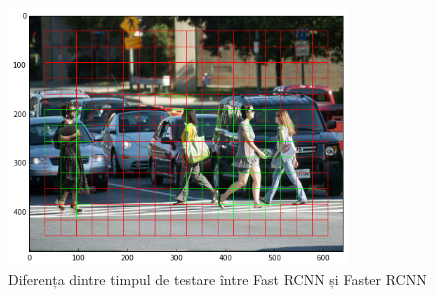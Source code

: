\begin{figure}[h!]
    	\centering
	\captionsetup{justification=centering, margin=2cm}
	\includegraphics[width=0.8\textwidth]{figures/last_con_lay_to_inp_img.png}
	\caption{Diferența dintre timpul de testare între  Fast RCNN și  Faster RCNN \cite{rcnn_vs_fast_rcnn}}
	\label{fig:class_detect_segment}
\end{figure}

